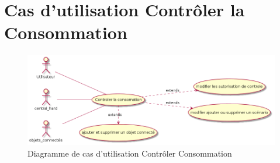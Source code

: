 \documentclass[10pt,a4paper]{report}
\begin{document}
		\section{Cas d'utilisation Contrôler la Consommation}

\begin{figure}[H]
	\centering
	\includegraphics[scale=0.55]{diagCU_ControlerConso}
	\caption{Diagramme de cas d'utilisation Contrôler Consommation}
	\label{diagCuControlerConso}
\end{figure}
\end{document}
